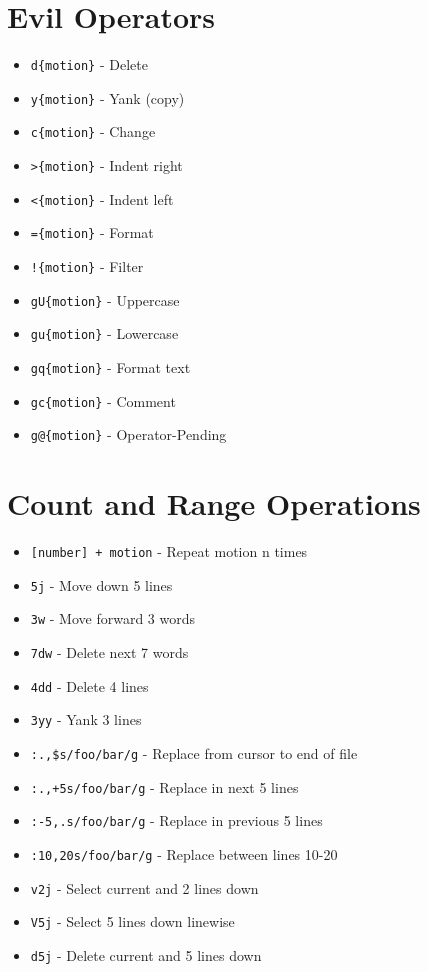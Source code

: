 \documentclass[6pt,landscape]{article}
\newcommand{\key}[1]{\texttt{#1}}
\begin{document}
\begin{multicols*}{5}
\section*{Evil Operators}
\begin{itemize}[leftmargin=*,itemsep=0pt,parsep=0pt,topsep=0pt]
\item \key{d\{motion\}} - Delete
\item \key{y\{motion\}} - Yank (copy)
\item \key{c\{motion\}} - Change
\item \key{>\{motion\}} - Indent right
\item \key{<\{motion\}} - Indent left
\item \key{=\{motion\}} - Format
\item \key{!\{motion\}} - Filter
\item \key{gU\{motion\}} - Uppercase
\item \key{gu\{motion\}} - Lowercase
\item \key{gq\{motion\}} - Format text
\item \key{gc\{motion\}} - Comment
\item \key{g@\{motion\}} - Operator-Pending
\end{itemize}

\section*{Count and Range Operations}
\begin{itemize}[leftmargin=*,itemsep=0pt,parsep=0pt,topsep=0pt]
\item \key{[number] + motion} - Repeat motion n times
\item \key{5j} - Move down 5 lines
\item \key{3w} - Move forward 3 words
\item \key{7dw} - Delete next 7 words
\item \key{4dd} - Delete 4 lines
\item \key{3yy} - Yank 3 lines

\item \key{:.,\$s/foo/bar/g} - Replace from cursor to end of file
\item \key{:.,+5s/foo/bar/g} - Replace in next 5 lines
\item \key{:-5,.s/foo/bar/g} - Replace in previous 5 lines
\item \key{:10,20s/foo/bar/g} - Replace between lines 10-20

\item \key{v2j} - Select current and 2 lines down
\item \key{V5j} - Select 5 lines down linewise
\item \key{d5j} - Delete current and 5 lines down


\end{itemize}
\end{multicols*}
\end{document}
